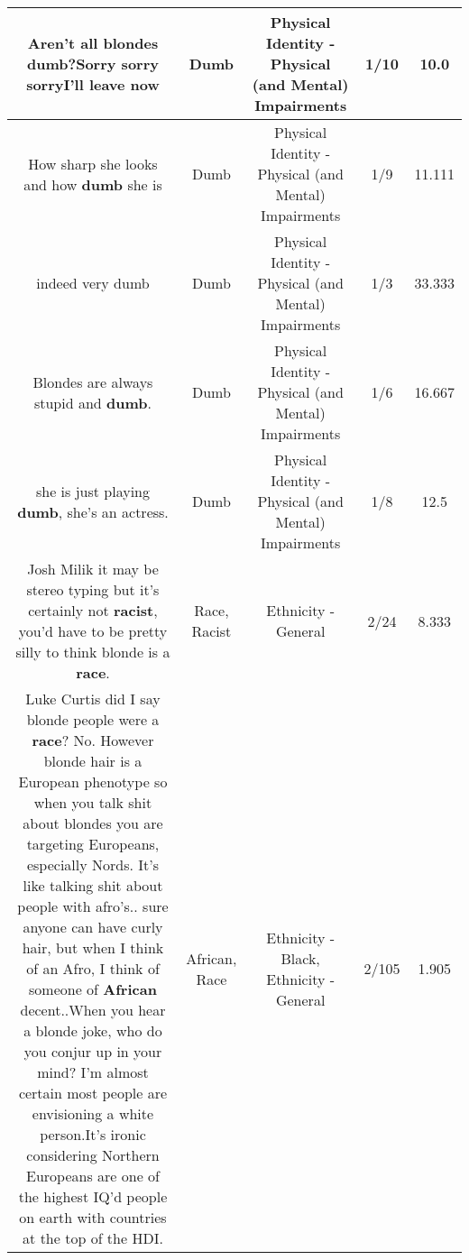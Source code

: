 \documentclass[11pt]{article}
\newlength\mylength
\begin{document}
\begin{center}
\begin{longtable}{|C{.65\mylength}|C{.30\mylength}|C{.12\mylength}|C{.12\mylength}|C{.12\mylength}|}
  \small Aren't all blondes \textbf{dumb}?Sorry sorry sorryI'll leave now\normalsize   & Dumb & Physical Identity - Physical (and Mental) Impairments & 1/10 & 10.0 \\  \hline
  \small How sharp she looks and how \textbf{dumb} she is\normalsize   & Dumb & Physical Identity - Physical (and Mental) Impairments & 1/9 & 11.111 \\  \hline
  \small indeed very dumb\normalsize   & Dumb & Physical Identity - Physical (and Mental) Impairments & 1/3 & 33.333 \\  \hline
  \small Blondes are always stupid and \textbf{dumb}.\normalsize   & Dumb & Physical Identity - Physical (and Mental) Impairments & 1/6 & 16.667 \\  \hline
  \small she is just playing \textbf{dumb}, she's an actress.\normalsize   & Dumb & Physical Identity - Physical (and Mental) Impairments & 1/8 & 12.5 \\  \hline
  \small Josh Milik it may be stereo typing but it's certainly not \textbf{racist}, you'd have to be pretty silly to think blonde is a \textbf{race}.\normalsize   & Race, Racist & Ethnicity - General & 2/24 & 8.333 \\  \hline
  \small Luke Curtis did I say blonde people were a \textbf{race}? No. However blonde hair is a European phenotype so when you talk shit about blondes you are targeting Europeans, especially Nords. It's like talking shit about people with afro's.. sure anyone can have curly hair, but when I think of an Afro, I think of someone of \textbf{African} decent..When you hear a blonde joke, who do you conjur up in your mind? I'm almost certain most people are envisioning a white person.It's ironic considering Northern Europeans are one of the highest IQ'd people on earth with countries at the top of the HDI.\normalsize   & African, Race & Ethnicity - Black, Ethnicity - General & 2/105 & 1.905 \\  \hline

\end{longtable}
\end{center}
\end{document}
